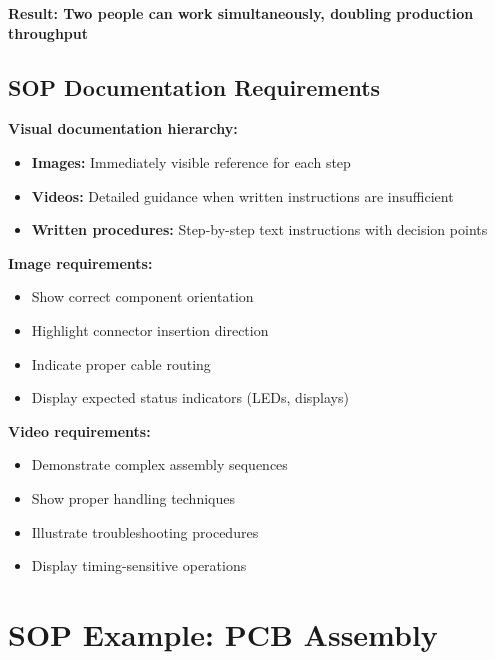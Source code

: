\textbf{Result: Two people can work simultaneously, doubling production throughput}

\subsection{SOP Documentation Requirements}

\textbf{Visual documentation hierarchy:}
\begin{itemize}
\item \textbf{Images:} Immediately visible reference for each step
\item \textbf{Videos:} Detailed guidance when written instructions are insufficient
\item \textbf{Written procedures:} Step-by-step text instructions with decision points
\end{itemize}

\textbf{Image requirements:}
\begin{itemize}
\item Show correct component orientation
\item Highlight connector insertion direction
\item Indicate proper cable routing
\item Display expected status indicators (LEDs, displays)
\end{itemize}

\textbf{Video requirements:}
\begin{itemize}
\item Demonstrate complex assembly sequences
\item Show proper handling techniques
\item Illustrate troubleshooting procedures
\item Display timing-sensitive operations
\end{itemize}

\section{SOP Example: PCB Assembly}

